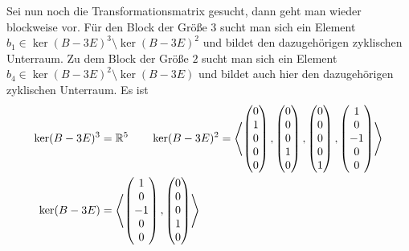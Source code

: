     Sei nun noch die Transformationsmatrix gesucht, dann geht man wieder blockweise vor.
    Für den Block der Größe $3$ sucht man sich ein Element $b_1 \in \ker(B-3E)^3 \setminus \ker(B-3E)^2$ und bildet den dazugehörigen zyklischen Unterraum.
    Zu dem Block der Größe $2$ sucht man sich ein Element $b_4 \in \ker(B-3E)^2 \setminus \ker(B-3E)$ und bildet auch hier den dazugehörigen zyklischen Unterraum.
    Es ist
    \begin{align*}
        \ker(B-3E)^3 & = \mathbb{R}^5 \qquad \ker(B-3E)^2 = \left\langle
        \begin{pmatrix}
            0\\1\\0\\0\\0
        \end{pmatrix},
        \begin{pmatrix}
            0\\0\\0\\1\\0
        \end{pmatrix},
        \begin{pmatrix}
            0\\0\\0\\0\\1
        \end{pmatrix},
        \begin{pmatrix}
            1\\0\\-1\\0\\0
        \end{pmatrix}
        \right\rangle \\
        \ker(B-3E) & =
        \left\langle
        \begin{pmatrix}
            1\\0\\-1\\0\\0
        \end{pmatrix},
        \begin{pmatrix}
            0\\0\\0\\1\\0
        \end{pmatrix}
        \right\rangle
    \end{align*}

